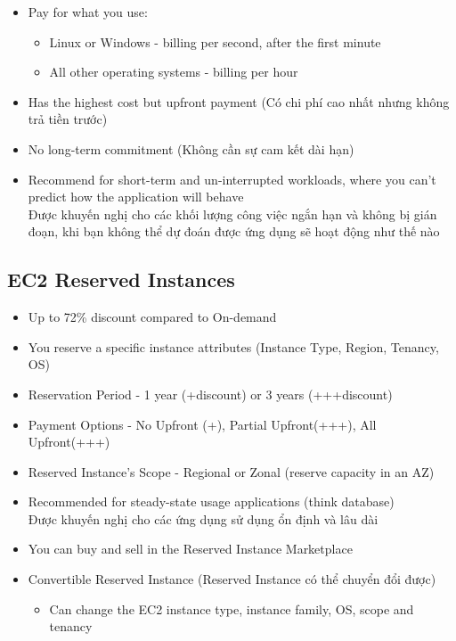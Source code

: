 \begin{itemize}
	\item Pay for what you use:
	\begin{itemize}
		\item Linux or Windows - billing per second, after the first minute
		\item All other operating systems - billing per hour
	\end{itemize}
	\item Has the highest cost but upfront payment (Có chi phí cao nhất nhưng không trả tiền trước)
	\item No long-term commitment (Không cần sự cam kết dài hạn)
	\item Recommend for short-term and un-interrupted workloads, where you can't predict how the application will behave \\ Được khuyến nghị cho các khối lượng công việc ngắn hạn và không bị gián đoạn, khi bạn không thể dự đoán được ứng dụng sẽ hoạt động như thế nào
\end{itemize}

\subsection{EC2 Reserved Instances}

\begin{itemize}
	\item Up to 72\% discount compared to On-demand
	\item You reserve a specific instance attributes (Instance Type, Region, Tenancy, OS)
	\item Reservation Period - 1 year (+discount) or 3 years (+++discount)
	\item Payment Options - No Upfront (+), Partial Upfront(+++), All Upfront(+++)
	\item Reserved Instance's Scope - Regional or Zonal (reserve capacity in an AZ)
	\item Recommended for steady-state usage applications (think database) \\ Được khuyến nghị cho các ứng dụng sử dụng ổn định và lâu dài
	\item You can buy and sell in the Reserved Instance Marketplace
	\item Convertible Reserved Instance (Reserved Instance có thể chuyển đổi được)
	\begin{itemize}
		\item Can change the EC2 instance type, instance family, OS, scope and tenancy
	\end{itemize}
\end{itemize} 

